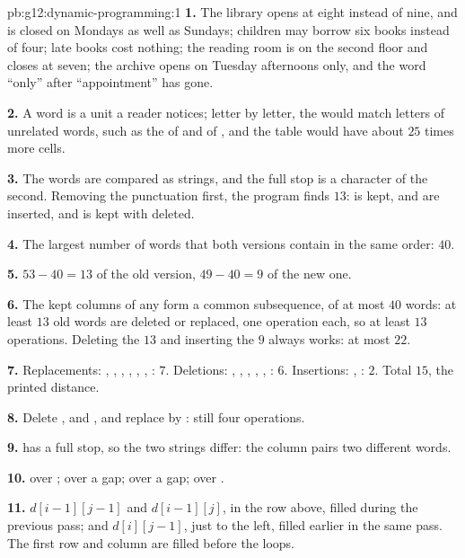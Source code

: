 \begin{solution}{pb:g12:dynamic-programming:1}
\textbf{1.} The library opens at eight instead of nine, and is closed on Mondays as well as Sundays; children may
borrow six books instead of four; late books cost nothing; the reading room is on the second floor and closes at
seven; the archive opens on Tuesday afternoons only, and the word ``only'' after ``appointment'' has gone.

\textbf{2.} A word is a unit a reader notices; letter by letter, the  would match letters of unrelated words,
such as the  of  and of , and the table would have about $25$ times more cells.

\textbf{3.} The words are compared as strings, and the full stop is a character of the second. Removing the
punctuation first, the program finds $13$:  is kept,  and  are inserted, and
 is kept with  deleted.

\textbf{4.} The largest number of words that both versions contain in the same order: $40$.

\textbf{5.} $53 - 40 = 13$ of the old version, $49 - 40 = 9$ of the new one.

\textbf{6.} The kept columns of any  form a common subsequence, of at most $40$ words: at least $13$ old words
are deleted or replaced, one operation each, so at least $13$ operations. Deleting the $13$ and inserting the $9$
always works: at most $22$.

\textbf{7.} Replacements: , , , , , ,
: $7$. Deletions: , , , , , :
$6$. Insertions: , : $2$. Total $15$, the printed distance.

\textbf{8.} Delete ,  and , and replace  by : still four
operations.

\textbf{9.}  has a full stop, so the two strings differ: the column pairs two different words.

\textbf{10.}  over ;  over a gap;  over a gap;
 over .

\textbf{11.} $d[i - 1][j - 1]$ and $d[i - 1][j]$, in the row above, filled during the previous pass; and $d[i][j - 1]$,
just to the left, filled earlier in the same pass. The first row and column are filled before the loops.


\end{solution}
